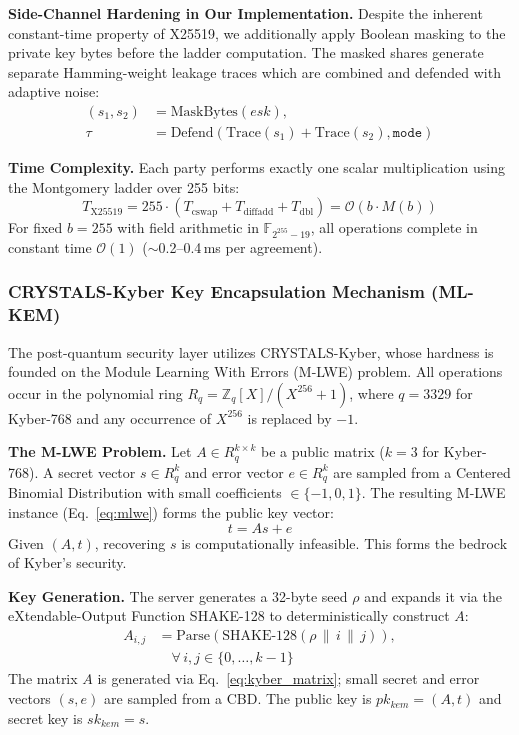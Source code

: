 \documentclass[journal, 10pt, twocolumn]{IEEEtran}
\begin{document}
\textbf{Side-Channel Hardening in Our Implementation.} Despite the inherent constant-time property of X25519, we additionally apply Boolean masking to the private key bytes before the ladder computation. The masked shares generate separate Hamming-weight leakage traces which are combined and defended with adaptive noise:
\begin{equation}
\begin{split}
(s_1, s_2) &= \text{MaskBytes}(esk), \\
\tau &= \text{Defend}(\text{Trace}(s_1) + \text{Trace}(s_2), \texttt{mode})
\end{split}
\label{eq:x25519_masking}
\end{equation}

\textbf{Time Complexity.} Each party performs exactly one scalar multiplication using the Montgomery ladder over 255 bits:
\begin{equation}
T_{\text{X25519}} = 255 \cdot (T_{\text{cswap}} + T_{\text{diffadd}} + T_{\text{dbl}}) = \mathcal{O}(b \cdot M(b))
\label{eq:x25519_complexity}
\end{equation}
For fixed $b = 255$ with field arithmetic in $\mathbb{F}_{2^{255}-19}$, all operations complete in constant time $\mathcal{O}(1)$ ($\sim$0.2--0.4\,ms per agreement).

\subsubsection{CRYSTALS-Kyber Key Encapsulation Mechanism (ML-KEM)}
The post-quantum security layer utilizes CRYSTALS-Kyber, whose hardness is founded on the Module Learning With Errors (M-LWE) problem. All operations occur in the polynomial ring $R_q = \mathbb{Z}_q[X]/(X^{256}+1)$, where $q = 3329$ for Kyber-768 and any occurrence of $X^{256}$ is replaced by $-1$.

\textbf{The M-LWE Problem.} Let $A \in R_q^{k \times k}$ be a public matrix ($k = 3$ for Kyber-768). A secret vector $s \in R_q^k$ and error vector $e \in R_q^k$ are sampled from a Centered Binomial Distribution with small coefficients $\in \{-1, 0, 1\}$. The resulting M-LWE instance (Eq.~\eqref{eq:mlwe}) forms the public key vector:
\begin{equation}
t = As + e
\label{eq:mlwe}
\end{equation}
Given $(A, t)$, recovering $s$ is computationally infeasible. This forms the bedrock of Kyber's security.

\textbf{Key Generation.} The server generates a 32-byte seed $\rho$ and expands it via the eXtendable-Output Function SHAKE-128 to deterministically construct $A$:
\begin{equation}
\begin{split}
A_{i,j} &= \text{Parse}(\text{SHAKE-128}(\rho \,\|\, i \,\|\, j)), \\
& \quad \forall\, i,j \in \{0, \ldots, k-1\}
\end{split}
\label{eq:kyber_matrix}
\end{equation}
The matrix $A$ is generated via Eq.~\eqref{eq:kyber_matrix}; small secret and error vectors $(s, e)$ are sampled from a CBD. The public key is $pk_{kem} = (A, t)$ and secret key is $sk_{kem} = s$.
\end{document}
